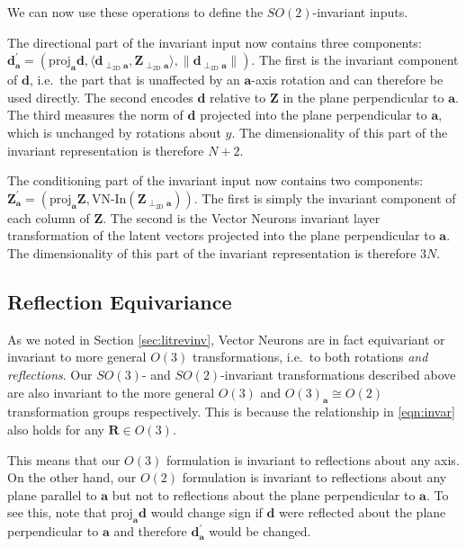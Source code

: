 We can now use these operations to define the $SO(2)$-invariant inputs.

The directional part of the invariant input now contains three components: $\mathbf{d}_\mathbf{a}^\prime=(\text{proj}_\mathbf{a}\mathbf{d}, \langle \mathbf{d}_{\perp_\text{2D}\mathbf{a}},\mathbf{Z}_{\perp_\text{2D}\mathbf{a}} \rangle, \|\mathbf{d}_{\perp_\text{2D}\mathbf{a}}\|)$. The first is the invariant component of $\mathbf{d}$, i.e.~the part that is unaffected by an $\mathbf{a}$-axis rotation and can therefore be used directly. The second encodes $\mathbf{d}$ relative to $\mathbf{Z}$ in the plane perpendicular to $\mathbf{a}$. The third measures the norm of $\mathbf{d}$ projected into the plane perpendicular to $\mathbf{a}$, which is unchanged by rotations about $y$. The dimensionality of this part of the invariant representation is therefore $N+2$.

The conditioning part of the invariant input now contains two components: $\mathbf{Z}_\mathbf{a}^\prime=(\text{proj}_\mathbf{a}\mathbf{Z},\text{VN-In}(\mathbf{Z}_{\perp_\text{2D}\mathbf{a}}))$. The first is simply the invariant component of each column of $\mathbf{Z}$. The second is the Vector Neurons invariant layer transformation of the latent vectors projected into the plane perpendicular to $\mathbf{a}$. The dimensionality of this part of the invariant representation is therefore $3N$.

\subsection{Reflection Equivariance}
\label{sec:reflection_equi}

As we noted in Section \ref{sec:litrevinv}, Vector Neurons are in fact equivariant or invariant to more general $O(3)$ transformations, i.e.~to both rotations \emph{and reflections}. Our $SO(3)$- and $SO(2)$-invariant transformations described above are also invariant to the more general $O(3)$ and $O(3)_{\mathbf{a}}\cong O(2)$ transformation groups respectively. This is because the relationship in \eqref{eqn:invar} also holds for any $\mathbf{R}\in O(3)$.

This means that our $O(3)$ formulation is invariant to reflections about any axis. On the other hand, our $O(2)$ formulation is invariant to reflections about any plane parallel to $\mathbf{a}$ but not to reflections about the plane perpendicular to $\mathbf{a}$. To see this, note that $\text{proj}_\mathbf{a}\mathbf{d}$ would change sign if $\mathbf{d}$ were reflected about the plane perpendicular to $\mathbf{a}$ and therefore $\mathbf{d}^\prime_\mathbf{a}$ would be changed.